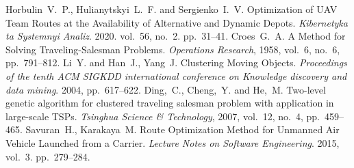 \documentclass[handout,notheorems]{beamer}
\theoremstyle{definition}
\begin{document}
\begin{frame}{}
    \begin{thebibliography}{5}
     Horbulin~V.~P., Hulianytskyi~L.~F. and Sergienko~I.~V. Optimization of UAV Team Routes at the Availability of Alternative and Dynamic Depots. \emph{Kibernetyka ta Systemnyi Analiz}. 2020. vol.~56, no.~2. pp.~31--41.
     Croes~G.~A. A Method for Solving Traveling-Salesman Problems. \emph{Operations Research}, 1958, vol.~6, no.~6, pp.~791--812.
     Li~Y. and Han~J., Yang~J. Clustering Moving Objects. \emph{Proceedings of the tenth ACM SIGKDD international conference on Knowledge discovery and data mining}. 2004, pp.~617--622. 
     Ding,~C., Cheng,~Y. and He,~M. Two-level genetic algorithm for clustered traveling salesman problem with application in large-scale TSPs. \emph{Tsinghua Science \& Technology}, 2007, vol.~12, no.~4, pp.~459--465.
     Savuran~H., Karakaya~M. Route Optimization Method for Unmanned Air Vehicle Launched from a Carrier. \emph{Lecture Notes on Software Engineering}. 2015, vol.~3. pp.~279--284.
    \end{thebibliography}
\end{frame}
\end{document}
